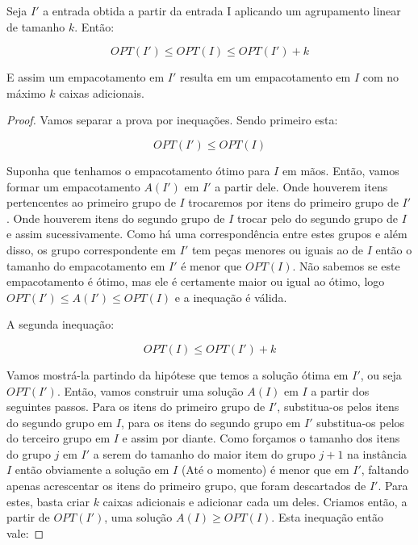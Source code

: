 \begin{lema}
\label{lem:empacotamentopecasgrandes}
Seja $I'$ a entrada obtida a partir da entrada I aplicando um agrupamento linear de tamanho $k$. Então:

\begin{equation*}
OPT(I') \leq OPT(I) \leq OPT(I')+k
\end{equation*}

E assim um empacotamento em $I'$ resulta em um empacotamento em $I$ com no máximo $k$ caixas adicionais.

\end{lema}

\begin{proof}

Vamos separar a prova por inequações. Sendo primeiro esta:

\begin{equation}
OPT(I') \leq OPT(I) 
\end{equation}

Suponha que tenhamos o empacotamento ótimo para $I$ em mãos. Então, vamos formar um empacotamento $A(I')$ em $I'$ a partir dele. Onde houverem itens pertencentes ao primeiro grupo de $I$ trocaremos por itens do primeiro grupo de $I'$. Onde houverem itens do segundo grupo de $I$ trocar pelo do segundo grupo de $I$ e assim sucessivamente. Como há uma correspondência entre estes grupos e além disso, os grupo correspondente em $I'$ tem peças menores ou iguais ao de $I$ então o tamanho do empacotamento em $I'$ é menor que $OPT(I)$. Não sabemos se este empacotamento é ótimo, mas ele é certamente maior ou igual ao ótimo, logo $OPT(I') \leq A(I') \leq OPT(I)$ e a inequação é válida.

A segunda inequação:

\begin{equation}
OPT(I) \leq OPT(I')+k
\end{equation}

Vamos mostrá-la partindo da hipótese que temos a solução ótima em $I'$, ou seja $OPT(I')$. Então, vamos construir uma solução $A(I)$ em $I$ a partir dos seguintes passos. Para os itens do primeiro grupo de $I'$, substitua-os pelos itens do segundo grupo em $I$, para os itens do segundo grupo em $I'$ substitua-os pelos do terceiro grupo em $I$ e assim por diante. Como forçamos o tamanho dos itens do grupo $j$ em $I'$ a serem do tamanho do maior item do grupo $j+1$ na instância $I$ então obviamente a solução em $I$ (Até o momento) é menor que em $I'$, faltando apenas acrescentar os itens do primeiro grupo, que foram descartados de $I'$. Para estes, basta criar $k$ caixas adicionais e adicionar cada um deles. Criamos então, a partir de $OPT(I')$, uma solução $A(I) \geq OPT(I)$. Esta inequação então vale:


\end{proof}
